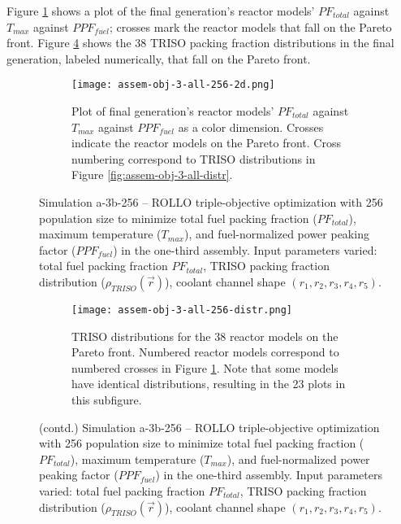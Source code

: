 Figure \ref{fig:assem-obj-3-all-256-2d} shows a plot of the final generation's reactor 
models' $PF_{total}$ against $T_{max}$ against $PPF_{fuel}$; crosses mark the reactor 
models that fall on the Pareto front.
Figure \ref{fig:assem-obj-3-all-256-distr} shows the 38 TRISO packing fraction 
distributions in the final generation, labeled numerically, that fall on the 
Pareto front. 
\begin{figure}[htbp!]
    \begin{subfigure}{\textwidth}
        \centering
        \texttt{[image: assem-obj-3-all-256-2d.png]}
        \caption{Plot of final generation's reactor models' $PF_{total}$ against 
        $T_{max}$ against $PPF_{fuel}$ as a color dimension. 
        Crosses indicate the reactor models on the 
        Pareto front. Cross numbering correspond to TRISO distributions in Figure 
        \ref{fig:assem-obj-3-all-distr}.}
        \label{fig:assem-obj-3-all-256-2d} 
    \end{subfigure}
    \caption{Simulation a-3b-256 -- ROLLO triple-objective optimization with 
    256 population size to minimize total fuel packing fraction ($PF_{total}$), 
    maximum temperature ($T_{max}$), and fuel-normalized power peaking factor 
    ($PPF_{fuel}$) in the one-third assembly. 
    Input parameters varied: total fuel packing fraction $PF_{total}$, 
    TRISO packing fraction distribution ($\rho_{TRISO}(\vec{r})$), 
    coolant channel shape $(r_1, r_2, r_3, r_4, r_5)$.}
    \label{fig:assem-obj-3-all-256}
\end{figure}
\begin{figure}[htbp!]
    \ContinuedFloat
    \begin{subfigure}{\textwidth}
        \centering
        \texttt{[image: assem-obj-3-all-256-distr.png]}
        \caption{TRISO distributions for the 38 reactor models on the Pareto front.
        Numbered reactor models correspond to numbered crosses in Figure 
        \ref{fig:assem-obj-3-all-256-2d}. 
        Note that some models have identical distributions, resulting in the 23 plots 
        in this subfigure.}
        \label{fig:assem-obj-3-all-256-distr} 
    \end{subfigure}
    \caption{(contd.) Simulation a-3b-256 -- ROLLO triple-objective optimization with 
    256 population size to minimize total fuel packing fraction ($PF_{total}$), 
    maximum temperature ($T_{max}$), and fuel-normalized power peaking factor 
    ($PPF_{fuel}$) in the one-third assembly. 
    Input parameters varied: total fuel packing fraction $PF_{total}$, 
    TRISO packing fraction distribution ($\rho_{TRISO}(\vec{r})$), 
    coolant channel shape $(r_1, r_2, r_3, r_4, r_5)$.}
\end{figure}

